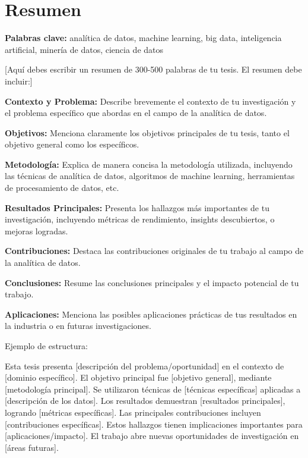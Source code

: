 
\chapter*{Resumen}

\textbf{Palabras clave:} analítica de datos, machine learning, big data, inteligencia artificial, minería de datos, ciencia de datos

\vspace{1cm}

[Aquí debes escribir un resumen de 300-500 palabras de tu tesis. El resumen debe incluir:]

\textbf{Contexto y Problema:} Describe brevemente el contexto de tu investigación y el problema específico que abordas en el campo de la analítica de datos.

\textbf{Objetivos:} Menciona claramente los objetivos principales de tu tesis, tanto el objetivo general como los específicos.

\textbf{Metodología:} Explica de manera concisa la metodología utilizada, incluyendo las técnicas de analítica de datos, algoritmos de machine learning, herramientas de procesamiento de datos, etc.

\textbf{Resultados Principales:} Presenta los hallazgos más importantes de tu investigación, incluyendo métricas de rendimiento, insights descubiertos, o mejoras logradas.

\textbf{Contribuciones:} Destaca las contribuciones originales de tu trabajo al campo de la analítica de datos.

\textbf{Conclusiones:} Resume las conclusiones principales y el impacto potencial de tu trabajo.

\textbf{Aplicaciones:} Menciona las posibles aplicaciones prácticas de tus resultados en la industria o en futuras investigaciones.

Ejemplo de estructura:

Esta tesis presenta [descripción del problema/oportunidad] en el contexto de [dominio específico]. El objetivo principal fue [objetivo general], mediante [metodología principal]. Se utilizaron técnicas de [técnicas específicas] aplicadas a [descripción de los datos]. Los resultados demuestran [resultados principales], logrando [métricas específicas]. Las principales contribuciones incluyen [contribuciones específicas]. Estos hallazgos tienen implicaciones importantes para [aplicaciones/impacto]. El trabajo abre nuevas oportunidades de investigación en [áreas futuras].

\newpage
